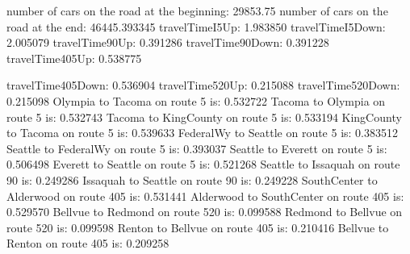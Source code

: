 number of cars on the road at the beginning:
29853.75
number of cars on the road at the end:
46445.393345
travelTimeI5Up: 1.983850
travelTimeI5Down: 2.005079
travelTime90Up: 0.391286
travelTime90Down: 0.391228
travelTime405Up: 0.538775

travelTime405Down: 0.536904
travelTime520Up: 0.215088
travelTime520Down: 0.215098
Olympia to Tacoma on route 5 is: 0.532722
Tacoma to Olympia on route 5 is: 0.532743
Tacoma to KingCounty on route 5 is: 0.533194
KingCounty to Tacoma on route 5 is: 0.539633
FederalWy to Seattle on route 5 is: 0.383512
Seattle to FederalWy on route 5 is: 0.393037
Seattle to Everett on route 5 is: 0.506498
Everett to Seattle on route 5 is: 0.521268
Seattle to Issaquah on route 90 is: 0.249286
Issaquah to Seattle on route 90 is: 0.249228
SouthCenter to Alderwood on route 405 is: 0.531441
Alderwood to SouthCenter on route 405 is: 0.529570
Bellvue to Redmond on route 520 is: 0.099588
Redmond to Bellvue on route 520 is: 0.099598
Renton to Bellvue on route 405 is: 0.210416
Bellvue to Renton on route 405 is: 0.209258